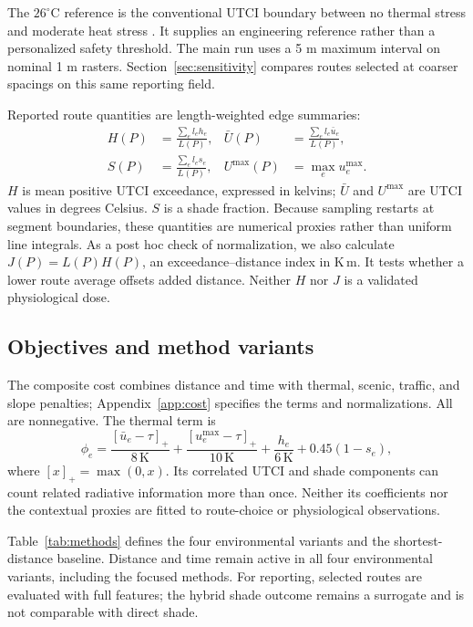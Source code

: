 \documentclass[sigconf,nonacm]{acmart}
\begin{document}
The $26^\circ$C reference is the conventional UTCI boundary between no thermal stress and moderate heat stress \citep{eeautci}. It supplies an engineering reference rather than a personalized safety threshold. The main run uses a 5 m maximum interval on nominal 1 m rasters. Section~\ref{sec:sensitivity} compares routes selected at coarser spacings on this same reporting field.

Reported route quantities are length-weighted edge summaries:
\begin{align}
 H(P)&=\frac{\sum_e l_eh_e}{L(P)},&\bar U(P)&=\frac{\sum_e l_e\bar u_e}{L(P)},\\
 S(P)&=\frac{\sum_e l_es_e}{L(P)},&U^{\max}(P)&=\max_e u_e^{\max}.
\end{align}
$H$ is mean positive UTCI exceedance, expressed in kelvins; $\bar U$ and $U^{\max}$ are UTCI values in degrees Celsius. $S$ is a shade fraction. Because sampling restarts at segment boundaries, these quantities are numerical proxies rather than uniform line integrals. As a post hoc check of normalization, we also calculate $J(P)=L(P)H(P)$, an exceedance--distance index in K\,m. It tests whether a lower route average offsets added distance. Neither $H$ nor $J$ is a validated physiological dose.

\subsection{Objectives and method variants}
The composite cost combines distance and time with thermal, scenic, traffic, and slope penalties; Appendix~\ref{app:cost} specifies the terms and normalizations. All are nonnegative. The thermal term is
\begin{equation}\label{eq:thermal}
 \phi_e=\frac{[\bar u_e-\tau]_+}{8\,\mathrm K}+\frac{[u_e^{\max}-\tau]_+}{10\,\mathrm K}+\frac{h_e}{6\,\mathrm K}+0.45(1-s_e),
\end{equation}
where $[x]_+=\max(0,x)$. Its correlated UTCI and shade components can count related radiative information more than once. Neither its coefficients nor the contextual proxies are fitted to route-choice or physiological observations.

Table~\ref{tab:methods} defines the four environmental variants and the shortest-distance baseline. Distance and time remain active in all four environmental variants, including the focused methods. For reporting, selected routes are evaluated with full features; the hybrid shade outcome remains a surrogate and is not comparable with direct shade.
\end{document}
